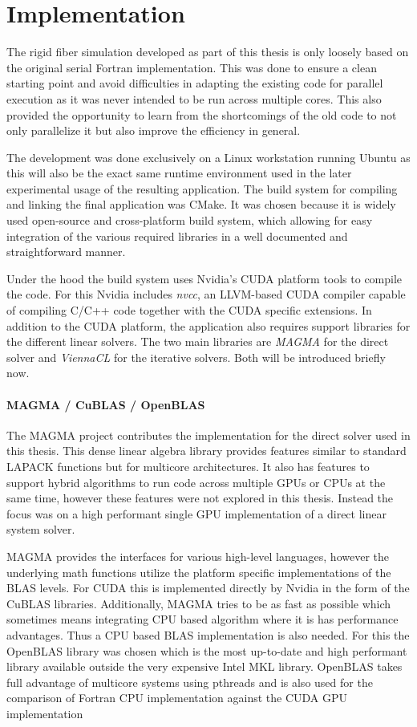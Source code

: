 \documentclass[a4paper,11pt]{kth-mag}
\begin{document}
\section{Implementation}
The rigid fiber simulation developed as part of this thesis is only loosely based on the original serial Fortran implementation. This was done to ensure a clean starting point and avoid difficulties in adapting the existing code for parallel execution as it was never intended to be run across multiple cores. This also provided the opportunity to learn from the shortcomings of the old code to not only parallelize it but also improve the efficiency in general.

The development was done exclusively on a Linux workstation running Ubuntu as this will also be the exact same runtime environment used in the later experimental usage of the resulting application. The build system for compiling and linking the final application was CMake. It was chosen because it is widely used open-source and cross-platform build system, which allowing for easy integration of the various required libraries in a well documented and straightforward manner.

Under the hood the build system uses Nvidia's CUDA platform tools to compile the code. For this Nvidia includes \emph{nvcc}, an LLVM-based CUDA compiler capable of compiling C/C++ code together with the CUDA specific extensions. In addition to the CUDA platform, the application also requires support libraries for the different linear solvers. The two main libraries are \emph{MAGMA} for the direct solver and \emph{ViennaCL} for the iterative solvers. Both will be introduced briefly now.

\paragraph{MAGMA / CuBLAS / OpenBLAS}
The MAGMA project contributes the implementation for the direct solver used in this thesis. This dense linear algebra library provides features similar to standard LAPACK functions but for multicore architectures. It also has features to support hybrid algorithms to run code across multiple GPUs or CPUs at the same time, however these features were not explored in this thesis. Instead the focus was on a high performant single GPU implementation of a direct linear system solver.

MAGMA provides the interfaces for various high-level languages, however the underlying math functions utilize the platform specific implementations of the BLAS levels. For CUDA this is implemented directly by Nvidia in the form of the CuBLAS libraries. Additionally, MAGMA tries to be as fast as possible which sometimes means integrating CPU based algorithm where it is has performance advantages. Thus a CPU based BLAS implementation is also needed. For this the OpenBLAS library was chosen which is the most up-to-date and high performant library available outside the very expensive Intel MKL library. OpenBLAS takes full advantage of multicore systems using pthreads and is also used for the comparison of Fortran CPU implementation against the CUDA GPU implementation
\end{document}
